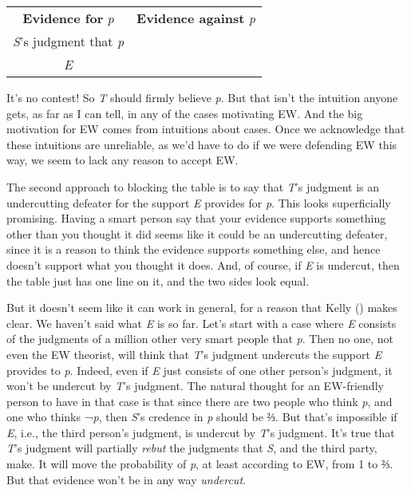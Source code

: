 \documentclass[
  10pt,
  letterpaper,
  DIV=11,
  numbers=noendperiod,
  twoside]{scrartcl}
\begin{document}
\begin{longtable}[]{@{}cc@{}}
\toprule\noalign{}
\endhead
\bottomrule\noalign{}
\endlastfoot
\textbf{Evidence for} \emph{p} & \textbf{Evidence against} \emph{p} \\
\emph{S}'s judgment that \emph{p} & \\
\emph{E} & \\
\end{longtable}

It's no contest! So \emph{T} should firmly believe \emph{p}. But that
isn't the intuition anyone gets, as far as I can tell, in any of the
cases motivating EW. And the big motivation for EW comes from intuitions
about cases. Once we acknowledge that these intuitions are unreliable,
as we'd have to do if we were defending EW this way, we seem to lack any
reason to accept EW.

The second approach to blocking the table is to say that \emph{T}'s
judgment is an undercutting defeater for the support \emph{E} provides
for \emph{p}. This looks superficially promising. Having a smart person
say that your evidence supports something other than you thought it did
seems like it could be an undercutting defeater, since it is a reason to
think the evidence supports something else, and hence doesn't support
what you thought it does. And, of course, if \emph{E} is undercut, then
the table just has one line on it, and the two sides look equal.

But it doesn't seem like it can work in general, for a reason that Kelly
() makes clear. We haven't said
what \emph{E} is so far. Let's start with a case where \emph{E} consists
of the judgments of a million other very smart people that \emph{p}.
Then no one, not even the EW theorist, will think that \emph{T}'s
judgment undercuts the support \emph{E} provides to \emph{p}. Indeed,
even if \emph{E} just consists of one other person's judgment, it won't
be undercut by \emph{T}'s judgment. The natural thought for an
EW-friendly person to have in that case is that since there are two
people who think \emph{p}, and one who thinks ¬\emph{p}, then \emph{S}'s
credence in \emph{p} should be ⅔. But that's impossible if \emph{E},
i.e., the third person's judgment, is undercut by \emph{T}'s judgment.
It's true that \emph{T}'s judgment will partially \emph{rebut} the
judgments that \emph{S}, and the third party, make. It will move the
probability of \emph{p}, at least according to EW, from 1 to ⅔. But that
evidence won't be in any way \emph{undercut}.
\end{document}
